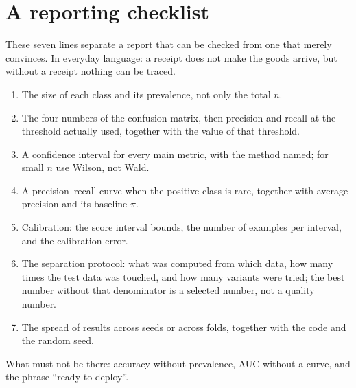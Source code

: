 \section{A reporting checklist}

These seven lines separate a report that can be checked from one that merely convinces. In everyday
language: a receipt does not make the goods arrive, but without a receipt nothing can be traced.

\begin{enumerate}
  \item The size of each class and its prevalence, not only the total $n$.
  \item The four numbers of the confusion matrix, then precision and recall at the threshold
        actually used, together with the value of that threshold.
  \item A confidence interval for every main metric, with the method named; for small $n$ use
        Wilson, not Wald.
  \item A precision--recall curve when the positive class is rare, together with average precision
        and its baseline $\pi$.
  \item Calibration: the score interval bounds, the number of examples per interval, and the
        calibration error.
  \item The separation protocol: what was computed from which data, how many times the test data
        was touched, and how many variants were tried; the best number without that denominator is
        a selected number, not a quality number.
  \item The spread of results across seeds or across folds, together with the code and the random
        seed.
\end{enumerate}

What must not be there: accuracy without prevalence, AUC without a curve, and the phrase ``ready to
deploy''.

